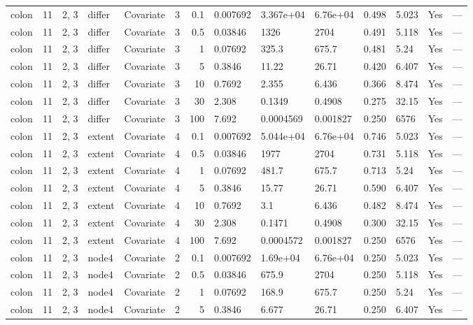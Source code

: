 \begin{tabular}{lrlllrrlllllll}
  colon & 11 & 2, 3 & differ & Covariate & 3 &   0.1 & 0.007692 & 3.367e+04 & 6.76e+04 & 0.498 & 5.023 & Yes & --- \\ 
  colon & 11 & 2, 3 & differ & Covariate & 3 &   0.5 & 0.03846 & 1326 & 2704 & 0.491 & 5.118 & Yes & --- \\ 
  colon & 11 & 2, 3 & differ & Covariate & 3 &     1 & 0.07692 & 325.3 & 675.7 & 0.481 & 5.24 & Yes & --- \\ 
  colon & 11 & 2, 3 & differ & Covariate & 3 &     5 & 0.3846 & 11.22 & 26.71 & 0.420 & 6.407 & Yes & --- \\ 
  colon & 11 & 2, 3 & differ & Covariate & 3 &    10 & 0.7692 & 2.355 & 6.436 & 0.366 & 8.474 & Yes & --- \\ 
  colon & 11 & 2, 3 & differ & Covariate & 3 &    30 & 2.308 & 0.1349 & 0.4908 & 0.275 & 32.15 & Yes & --- \\ 
  colon & 11 & 2, 3 & differ & Covariate & 3 &   100 & 7.692 & 0.0004569 & 0.001827 & 0.250 & 6576 & Yes & --- \\ 
  colon & 11 & 2, 3 & extent & Covariate & 4 &   0.1 & 0.007692 & 5.044e+04 & 6.76e+04 & 0.746 & 5.023 & Yes & --- \\ 
  colon & 11 & 2, 3 & extent & Covariate & 4 &   0.5 & 0.03846 & 1977 & 2704 & 0.731 & 5.118 & Yes & --- \\ 
  colon & 11 & 2, 3 & extent & Covariate & 4 &     1 & 0.07692 & 481.7 & 675.7 & 0.713 & 5.24 & Yes & --- \\ 
  colon & 11 & 2, 3 & extent & Covariate & 4 &     5 & 0.3846 & 15.77 & 26.71 & 0.590 & 6.407 & Yes & --- \\ 
  colon & 11 & 2, 3 & extent & Covariate & 4 &    10 & 0.7692 & 3.1 & 6.436 & 0.482 & 8.474 & Yes & --- \\ 
  colon & 11 & 2, 3 & extent & Covariate & 4 &    30 & 2.308 & 0.1471 & 0.4908 & 0.300 & 32.15 & Yes & --- \\ 
  colon & 11 & 2, 3 & extent & Covariate & 4 &   100 & 7.692 & 0.0004572 & 0.001827 & 0.250 & 6576 & Yes & --- \\ 
  colon & 11 & 2, 3 & node4 & Covariate & 2 &   0.1 & 0.007692 & 1.69e+04 & 6.76e+04 & 0.250 & 5.023 & Yes & --- \\ 
  colon & 11 & 2, 3 & node4 & Covariate & 2 &   0.5 & 0.03846 & 675.9 & 2704 & 0.250 & 5.118 & Yes & --- \\ 
  colon & 11 & 2, 3 & node4 & Covariate & 2 &     1 & 0.07692 & 168.9 & 675.7 & 0.250 & 5.24 & Yes & --- \\ 
  colon & 11 & 2, 3 & node4 & Covariate & 2 &     5 & 0.3846 & 6.677 & 26.71 & 0.250 & 6.407 & Yes & --- \\ 

\end{tabular}
